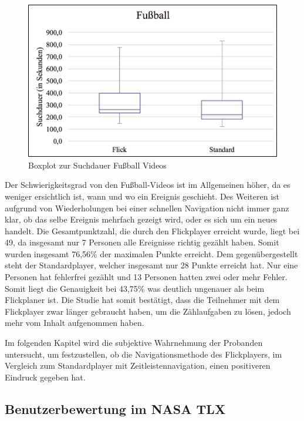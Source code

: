 \documentclass[11pt,a4paper]{report}
\begin{document}
\begin{figure}[h]
\begin{center}
\includegraphics[scale=0.9]{./images/36.png}
\caption{Boxplot zur Suchdauer Fußball Videos}
\label{boxplot_fussball}
\end{center}
\end{figure}
Der Schwierigkeitsgrad von den Fußball-Videos ist im Allgemeinen höher, da es weniger ersichtlich ist, wann und wo ein Ereignis geschieht. Des Weiteren ist aufgrund von Wiederholungen bei einer schnellen Navigation nicht immer ganz klar, ob das selbe Ereignis mehrfach gezeigt wird, oder es sich um ein neues handelt. Die Gesamtpunktzahl, die durch den Flickplayer erreicht wurde, liegt bei 49, da insgesamt nur 7 Personen alle Ereignisse richtig gezählt haben. Somit wurden insgesamt 76,56\% der maximalen Punkte erreicht. Dem gegenübergestellt steht der Standardplayer, welcher insgesamt nur 28 Punkte erreicht hat. Nur eine Personen hat fehlerfrei gezählt und 13 Personen hatten zwei oder mehr Fehler. Somit liegt die Genauigkeit bei 43,75\% was deutlich ungenauer als beim Flickplaner ist. Die Studie hat somit bestätigt, dass die Teilnehmer mit dem Flickplayer zwar länger gebraucht haben, um die Zählaufgaben zu lösen, jedoch mehr vom Inhalt aufgenommen haben.

Im folgenden Kapitel wird die subjektive Wahrnehmung der Probanden untersucht, um festzustellen, ob die Navigationsmethode des Flickplayers, im Vergleich zum Standardplayer mit Zeitleistennavigation, einen positiveren Eindruck gegeben hat.

\subsection{Benutzerbewertung im NASA TLX}
\end{document}
